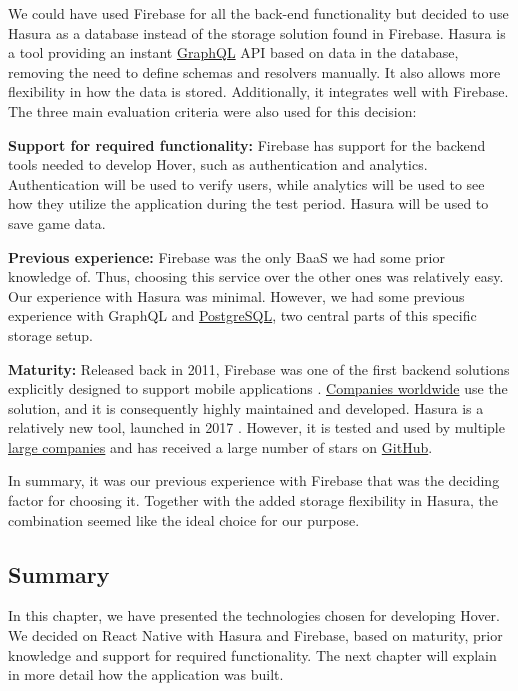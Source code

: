 We could have used Firebase for all the back-end functionality but decided to use Hasura as a database instead of the storage solution found in Firebase. Hasura is a tool providing an instant \href{https://graphql.org}{GraphQL} API based on data in the database, removing the need to define schemas and resolvers manually. It also allows more flexibility in how the data is stored. Additionally, it integrates well with Firebase. The three main evaluation criteria were also used for this decision:

\textbf{Support for required functionality:} Firebase has support for the backend tools needed to develop Hover, such as authentication and analytics.  Authentication will be used to verify users, while analytics will be used to see how they utilize the application during the test period. Hasura will be used to save game data.

\textbf{Previous experience:} Firebase was the only BaaS we had some prior knowledge of. Thus, choosing this service over the other ones was relatively easy. Our experience with Hasura was minimal. However, we had some previous experience with GraphQL and \href{https://www.postgresql.org}{PostgreSQL}, two central parts of this specific storage setup.

\textbf{Maturity:} Released back in 2011, Firebase was one of the first backend solutions explicitly designed to support mobile applications \citep{metz_firebase_2012}. \href{https://firebase.google.com}{Companies worldwide} use the solution, and it is consequently highly maintained and developed. Hasura is a relatively new tool, launched in 2017 \citep{hall_hasura_2018}. However, it is tested and used by multiple \href{https://hasura.io}{large companies} and has received a large number of stars on \href{https://github.com/hasura/graphql-engine}{GitHub}.

In summary, it was our previous experience with Firebase that was the deciding factor for choosing it. Together with the added storage flexibility in Hasura, the combination seemed like the ideal choice for our purpose.

\subsection{Summary}
In this chapter, we have presented the technologies chosen for developing Hover. We decided on React Native with Hasura and Firebase, based on maturity, prior knowledge and support for  required functionality. The next chapter will explain in more detail how the application was built.